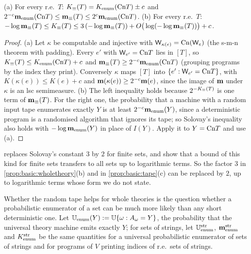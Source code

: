 \begin{proposition}\label{prop:basic:wholetheory}
(a) For every r.e.\ $T$: $K_{\equiv}(T)=K_{\mathrm{enum}}(\mathrm{Cn} T)\pm c$ and $2^{-c}\mathbf{m}_{\mathrm{enum}}(\mathrm{Cn} T)\le\mathbf{m}_{\equiv}(T)\le2^c\mathbf{m}_{\mathrm{enum}}(\mathrm{Cn} T)$.
(b) For every r.e.\ $T$: $-\log\mathbf{m}_{\equiv}(T)\le K_{\equiv}(T)\le3\,(-\log\mathbf{m}_{\equiv}(T))+O\big(\log(-\log\mathbf{m}_{\equiv}(T))\big)+c$.
\end{proposition}

\begin{proof}
(a) Let $\kappa$ be computable and injective with $\mathsf{W}_{\kappa(e)}=\mathrm{Cn}(\mathsf{W}_{e})$ (the s-m-n theorem with padding). Every $e'$ with $\mathsf{W}_{e'}=\mathrm{Cn} T$ lies in $[T]$, so $K_{\equiv}(T)\le K_{\mathrm{enum}}(\mathrm{Cn} T)+c$ and $\mathbf{m}_{\equiv}(T)\ge2^{-c}\mathbf{m}_{\mathrm{enum}}(\mathrm{Cn} T)$ (grouping programs by the index they print). Conversely $\kappa$ maps $[T]$ into $\{e':\mathsf{W}_{e'}=\mathrm{Cn} T\}$, with $K(\kappa(e))\le K(e)+c$ and $\mathbf{m}(\kappa(e))\ge2^{-c}\mathbf{m}(e)$, since the image of $\mathbf{m}$ under $\kappa$ is an lsc semimeasure. (b) The left inequality holds because $2^{-K_{\equiv}(T)}$ is one term of $\mathbf{m}_{\equiv}(T)$. For the right one, the probability that a machine with a random input tape enumerates exactly $Y$ is at least $2^{-c}\mathbf{m}_{\mathrm{enum}}(Y)$, since a deterministic program is a randomised algorithm that ignores its tape; so Solovay's inequality also holds with $-\log\mathbf{m}_{\mathrm{enum}}(Y)$ in place of $I(Y)$. Apply it to $Y=\mathrm{Cn} T$ and use (a).
\end{proof}

\begin{remark}\label{rem:basic:factortwo}
\citet{vereshchagin2007kolmogorov} replaces Solovay's constant $3$ by $2$ for finite sets, and \citet{shekhovtsov2023enumerating} show that a bound of this kind for finite sets transfers to all sets up to logarithmic terms. So the factor $3$ in \cref{prop:basic:wholetheory}(b) and in \cref{prop:basic:tape}(c) can be replaced by $2$, up to logarithmic terms whose form we do not state.
\end{remark}

Whether the random tape helps for whole theories is the question whether a probabilistic enumerator of a set can be much more likely than any short deterministic one. Let $\mathbb{U}_{\mathrm{enum}}(Y):=\mathbb{U}\{\omega:A_\omega=Y\}$, the probability that the universal theory machine emits exactly $Y$; for sets of strings, let $\mathbb{U}_{\mathrm{enum}}^{\rm str}$, $\mathbf{m}_{\mathrm{enum}}^{\rm str}$ and $K_{\mathrm{enum}}^{\rm str}$ be the same quantities for a universal probabilistic enumerator of sets of strings and for programs of $V$ printing indices of r.e.\ sets of strings.

